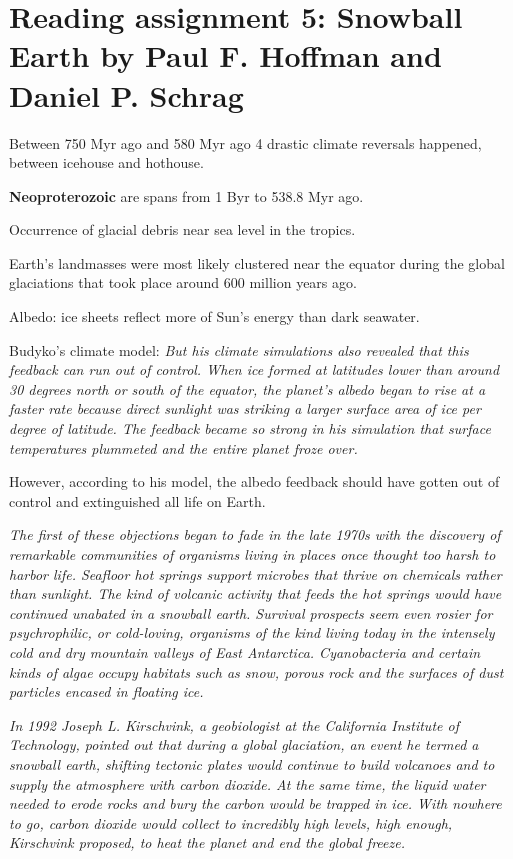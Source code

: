 
\section{Reading assignment 5: Snowball Earth by Paul F. Hoffman and Daniel
P. Schrag}

Between 750 Myr ago and 580 Myr ago 4 drastic climate reversals happened,
between icehouse and hothouse.

\textbf{Neoproterozoic} are spans from 1 Byr to 538.8 Myr ago.

Occurrence of glacial debris near sea level in the tropics.

Earth's landmasses were most likely clustered near the equator during the global
glaciations that took place around 600 million years ago.

Albedo: ice sheets reflect more of Sun's energy than dark seawater.

Budyko's climate model:
\textit{
But his climate simulations also revealed that this feedback can run out of
control. When ice formed at latitudes lower than around 30 degrees north or
south of the equator, the planet’s albedo began to rise at a faster rate
because direct sunlight was striking a larger surface area of ice per degree
of latitude. The feedback became so strong in his simulation that surface
temperatures plummeted and the entire planet froze over.
}

However, according to his model, the albedo feedback should have gotten out of
control and extinguished all life on Earth.

\textit{
The first of these objections began to fade in the late 1970s with the
discovery of remarkable communities of organisms living in places once
thought too harsh to harbor life. Seafloor hot springs support microbes that
thrive on chemicals rather than sunlight. The kind of volcanic activity that
feeds the hot springs would have continued unabated in a snowball earth.
Survival prospects seem even rosier for psychrophilic, or cold-loving,
organisms of the kind living today in the intensely cold and dry mountain
valleys of East Antarctica. Cyanobacteria and certain kinds of algae occupy
habitats such as snow, porous rock and the surfaces of dust particles encased
in floating ice.
}

\textit{
In 1992 Joseph L. Kirschvink, a geobiologist at the California Institute of
Technology, pointed out that during a global glaciation, an event he termed a
snowball earth, shifting tectonic plates would continue to build volcanoes and
to supply the atmosphere with carbon dioxide. At the same time, the liquid
water needed to erode rocks and bury the carbon would be trapped in ice.
With nowhere to go, carbon dioxide would collect to incredibly high levels,
high enough, Kirschvink proposed, to heat the planet and end the global freeze.
}

